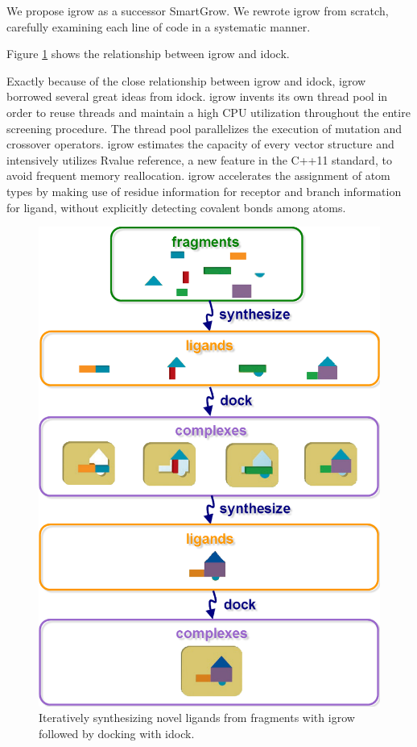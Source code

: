 We propose igrow as a successor SmartGrow. We rewrote igrow from scratch, carefully examining each line of code in a systematic manner.

Figure \ref{igrow:ComputationalSynthesis} shows the relationship between igrow and idock.

Exactly because of the close relationship between igrow and idock, igrow borrowed several great ideas from idock. igrow invents its own thread pool in order to reuse threads and maintain a high CPU utilization throughout the entire screening procedure. The thread pool parallelizes the execution of mutation and crossover operators. igrow estimates the capacity of every vector structure and intensively utilizes Rvalue reference, a new feature in the C++11 standard, to avoid frequent memory reallocation. igrow accelerates the assignment of atom types by making use of residue information for receptor and branch information for ligand, without explicitly detecting covalent bonds among atoms.

\begin{figure}
\centering
\includegraphics[width=\textwidth]{igrow/ComputationalSynthesis.png}
\caption{Iteratively synthesizing novel ligands from fragments with igrow followed by docking with idock.}
\label{igrow:ComputationalSynthesis}
\end{figure}

